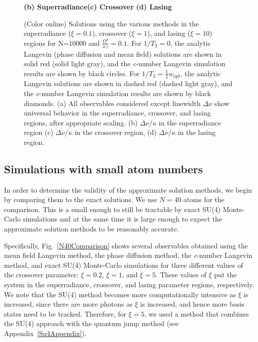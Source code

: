 \documentclass[aps,
twocolumn,
showpacs,
superscriptaddress,groupedaddress]{revtex4}
\begin{document}
\begin{figure}
\begin{center}
	\hspace{-10mm}\textbf{(b) Superradiance}\hspace{33mm}\textbf{(c) Crossover}
  \hspace{37mm}\textbf{(d) Lasing}
\end{center}
		\vspace{-5mm}
\caption{(Color online) Solutions using the various methods in the
superradiance ($\xi=0.1$), crossover ($\xi=1$), and lasing ($\xi=10$)
regions for N=10000 and $\frac{\Omega^2}{\kappa \gamma}=0.1$. For
$1/T_2=0$, the analytic Langevin (phase diffusion and mean field)
solutions are shown in solid red (solid light gray), and the
{\it c}-number Langevin simulation results are shown by black circles.
For $1/T_2=\frac{1}{5} w_{opt}$, the analytic Langevin solutions are
shown in dashed red (dashed light gray), and the {\it
c}-number Langevin simulation results are shown by black diamonds. (a)
All observables considered except linewidth  $\Delta \nu$ show universal
behavior in the superradiance, crossover, and lasing regions, after
appropriate scaling.  (b)  $\Delta \nu / \kappa$ in the superradiance
region (c) $\Delta \nu / \kappa$ in the crossover region, (d) $\Delta
\nu / \kappa$ in the lasing region.}
 \label{N10000Comparison}
\end{figure}


\subsection{Simulations with small atom numbers}

In order to determine the validity of the approximate solution methods,
we begin by comparing them to the exact solutions.  We use $N=40$ atoms
for the comparison.  This is a small enough to still be tractable by
exact SU(4) Monte-Carlo simulations and at the same time it is large
enough to expect the approximate solution methods to be reasonably
accurate. 

Specifically, Fig.~\ref{N40Comparison} shows several observables
obtained using the mean field Langevin method, the phase diffusion
method, the {\it c}-number Langevin method, and exact SU(4)
Monte-Carlo simulations for three different values of the crossover parameter:
$\xi=0.2$, $\xi=1$, and $\xi=5$. These values of $\xi$ put the system in the
superradiance, crossover, and lasing parameter regions, respectively.
We note that the SU(4) method becomes more computationally intensive as $\xi$ is increased, since there are more photons as $\xi$ is increased, and hence
more basis states need to be tracked. Therefore, for $\xi=5$, we used a
method that combines the SU(4) approach with the quantum jump method (see Appendix~\ref{Su4Appendix}).
\end{document}
